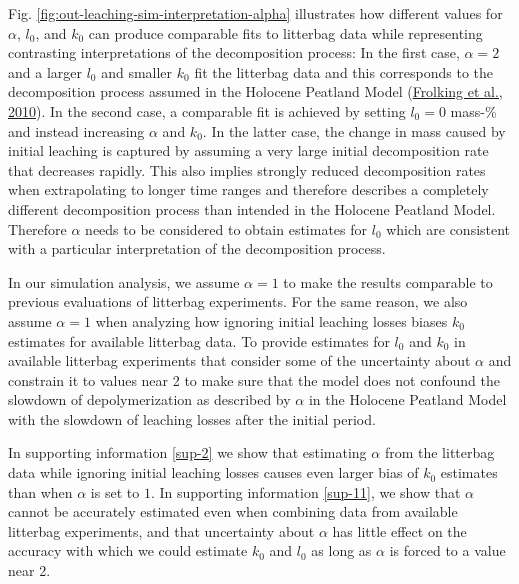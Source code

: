 \documentclass[
  12pt,
]{article}
\begin{document}
Fig. \ref{fig:out-leaching-sim-interpretation-alpha} illustrates how different values for \(\alpha\), \(l_0\), and \(k_0\) can produce comparable fits to litterbag data while representing contrasting interpretations of the decomposition process: In the first case, \(\alpha=2\) and a larger \(l_0\) and smaller \(k_0\) fit the litterbag data and this corresponds to the decomposition process assumed in the Holocene Peatland Model (\protect\hyperlink{ref-Frolking.2010}{Frolking et al., 2010}). In the second case, a comparable fit is achieved by setting \(l_0=0\) mass-\% and instead increasing \(\alpha\) and \(k_0\). In the latter case, the change in mass caused by initial leaching is captured by assuming a very large initial decomposition rate that decreases rapidly. This also implies strongly reduced decomposition rates when extrapolating to longer time ranges and therefore describes a completely different decomposition process than intended in the Holocene Peatland Model. Therefore \(\alpha\) needs to be considered to obtain estimates for \(l_0\) which are consistent with a particular interpretation of the decomposition process.

In our simulation analysis, we assume \(\alpha = 1\) to make the results comparable to previous evaluations of litterbag experiments. For the same reason, we also assume \(\alpha = 1\) when analyzing how ignoring initial leaching losses biases \(k_0\) estimates for available litterbag data. To provide estimates for \(l_0\) and \(k_0\) in available litterbag experiments that consider some of the uncertainty about \(\alpha\) and constrain it to values near 2 to make sure that the model does not confound the slowdown of depolymerization as described by \(\alpha\) in the Holocene Peatland Model with the slowdown of leaching losses after the initial period.

In supporting information \ref{sup-2} we show that estimating \(\alpha\) from the litterbag data while ignoring initial leaching losses causes even larger bias of \(k_0\) estimates than when \(\alpha\) is set to \(1\). In supporting information \ref{sup-11}, we show that \(\alpha\) cannot be accurately estimated even when combining data from available litterbag experiments, and that uncertainty about \(\alpha\) has little effect on the accuracy with which we could estimate \(k_0\) and \(l_0\) as long as \(\alpha\) is forced to a value near 2.
\end{document}
